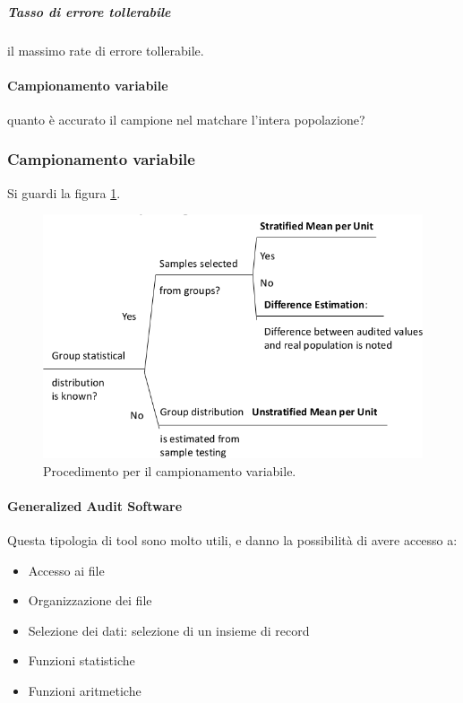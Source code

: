 \subparagraph*{Tasso di errore tollerabile} il massimo rate di errore
tollerabile.

\paragraph*{Campionamento variabile} quanto è accurato il campione nel matchare
l'intera popolazione?


\subsubsection{Campionamento variabile}
Si guardi la figura \ref{fig:variable:sampling}.
\begin{figure}[h!]
        \begin{center}
                \includegraphics[scale=0.45]{res/img/variable_sampling.png}
        \end{center}
        \caption{Procedimento per il campionamento variabile.}
        \label{fig:variable:sampling}
\end{figure}



\paragraph{Generalized Audit Software}

Questa tipologia di tool sono molto utili, e danno la possibilità di avere
accesso a:
\begin{itemize}
\item Accesso ai file
\item Organizzazione dei file
\item Selezione dei dati: selezione di un insieme di record
\item Funzioni statistiche
\item Funzioni aritmetiche
\end{itemize}

